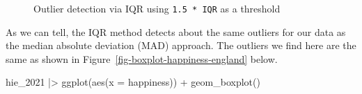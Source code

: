 \documentclass[
  letterpaper,
  DIV=11,
  numbers=noendperiod]{scrreprt}
\newenvironment{Shaded}{\begin{snugshade}}{\end{snugshade}}
\newcommand{\AttributeTok}[1]{\textcolor[rgb]{0.40,0.45,0.13}{#1}}
\newcommand{\FunctionTok}[1]{\textcolor[rgb]{0.28,0.35,0.67}{#1}}
\newcommand{\NormalTok}[1]{\textcolor[rgb]{0.00,0.23,0.31}{#1}}
\newcommand{\SpecialCharTok}[1]{\textcolor[rgb]{0.37,0.37,0.37}{#1}}
\begin{document}
\begin{figure}


\caption{\label{fig-iqr-threshold}Outlier detection via IQR using
\texttt{1.5\ *\ IQR} as a threshold}

\end{figure}%

As we can tell, the IQR method detects about the same outliers for our
data as the median absolute deviation (MAD) approach. The outliers we
find here are the same as shown in
Figure~\ref{fig-boxplot-happiness-england} below.

\begin{Shaded}
\begin{Highlighting}[]
\NormalTok{hie\_2021 }\SpecialCharTok{|\textgreater{}}
  \FunctionTok{ggplot}\NormalTok{(}\FunctionTok{aes}\NormalTok{(}\AttributeTok{x =}\NormalTok{ happiness)) }\SpecialCharTok{+}
  \FunctionTok{geom\_boxplot}\NormalTok{()}
\end{Highlighting}
\end{Shaded}
\end{document}
